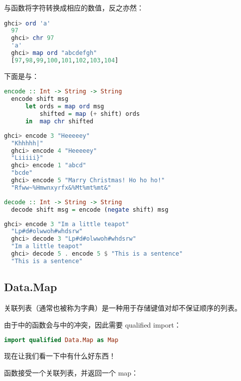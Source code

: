 \documentclass[./main.tex]{subfiles}
\begin{document}
与函数将字符转换成相应的数值，反之亦然：

\begin{lstlisting}[language=Haskell]
  ghci> ord 'a'
  97
  ghci> chr 97
  'a'
  ghci> map ord "abcdefgh"
  [97,98,99,100,101,102,103,104]
\end{lstlisting}

下面是与：

\begin{lstlisting}[language=Haskell]
  encode :: Int -> String -> String
  encode shift msg
      let ords = map ord msg
          shifted = map (+ shift) ords
      in  map chr shifted
\end{lstlisting}

\begin{lstlisting}[language=Haskell]
  ghci> encode 3 "Heeeeey"
  "Khhhhh|"
  ghci> encode 4 "Heeeeey"
  "Liiiii}"
  ghci> encode 1 "abcd"
  "bcde"
  ghci> encode 5 "Marry Christmas! Ho ho ho!"
  "Rfww~%Hmwnxyrfx&%Mt%mt%mt&"
\end{lstlisting}

\begin{lstlisting}[language=Haskell]
  decode :: Int -> String -> String
  decode shift msg = encode (negate shift) msg
\end{lstlisting}

\begin{lstlisting}[language=Haskell]
  ghci> encode 3 "Im a little teapot"
  "Lp#d#olwwoh#whdsrw"
  ghci> decode 3 "Lp#d#olwwoh#whdsrw"
  "Im a little teapot"
  ghci> decode 5 . encode 5 $ "This is a sentence"
  "This is a sentence"
\end{lstlisting}

\subsection*{Data.Map}

关联列表（通常也被称为字典）是一种用于存储键值对却不保证顺序的列表。

由于中的函数会与中的冲突，因此需要 qualified import：

\begin{lstlisting}[language=Haskell]
import qualified Data.Map as Map
\end{lstlisting}

现在让我们看一下中有什么好东西！

函数接受一个关联列表，并返回一个 map：
\end{document}
